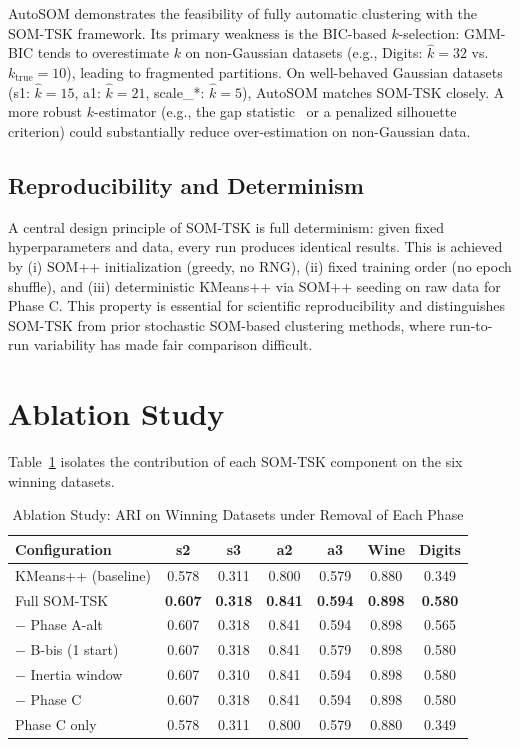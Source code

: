 \documentclass[journal]{IEEEtran}
\begin{document}
AutoSOM demonstrates the feasibility of fully automatic clustering with the SOM-TSK framework. Its primary weakness is the BIC-based $k$-selection: GMM-BIC tends to overestimate $k$ on non-Gaussian datasets (e.g., Digits: $\hat{k} = 32$ vs.\ $k_{\text{true}} = 10$), leading to fragmented partitions. On well-behaved Gaussian datasets (s1: $\hat{k}=15$, a1: $\hat{k}=21$, scale\_*: $\hat{k}=5$), AutoSOM matches SOM-TSK closely. A more robust $k$-estimator (e.g., the gap statistic~\cite{tibshirani2001estimating} or a penalized silhouette criterion) could substantially reduce over-estimation on non-Gaussian data.

\subsection{Reproducibility and Determinism}

A central design principle of SOM-TSK is full determinism: given fixed hyperparameters and data, every run produces identical results. This is achieved by (i) SOM++ initialization (greedy, no RNG), (ii) fixed training order (no epoch shuffle), and (iii) deterministic KMeans++ via SOM++ seeding on raw data for Phase C. This property is essential for scientific reproducibility and distinguishes SOM-TSK from prior stochastic SOM-based clustering methods, where run-to-run variability has made fair comparison difficult.

\section{Ablation Study}
\label{sec:ablation}

Table~\ref{tab:ablation} isolates the contribution of each SOM-TSK component on the six winning datasets.

\begin{table}[!t]
\caption{Ablation Study: ARI on Winning Datasets under Removal of Each Phase}
\label{tab:ablation}
\centering
\renewcommand{\arraystretch}{1.05}
\small
\setlength{\tabcolsep}{2.8pt}
\begin{tabular}{lcccccc}
\toprule
Configuration & s2 & s3 & a2 & a3 & Wine & Digits \\
\midrule
KMeans++ (baseline)    & 0.578 & 0.311 & 0.800 & 0.579 & 0.880 & 0.349 \\
\midrule
Full SOM-TSK           & \textbf{0.607} & \textbf{0.318} & \textbf{0.841} & \textbf{0.594} & \textbf{0.898} & \textbf{0.580} \\
$-$ Phase A-alt        & 0.607 & 0.318 & 0.841 & 0.594 & 0.898 & 0.565 \\
$-$ B-bis (1 start)    & 0.607 & 0.318 & 0.841 & 0.579 & 0.898 & 0.580 \\
$-$ Inertia window     & 0.607 & 0.310 & 0.841 & 0.594 & 0.898 & 0.580 \\
$-$ Phase C            & 0.607 & 0.318 & 0.841 & 0.594 & 0.898 & 0.580 \\
Phase C only           & 0.578 & 0.311 & 0.800 & 0.579 & 0.880 & 0.349 \\
\bottomrule
\end{tabular}
\end{table}
\end{document}
